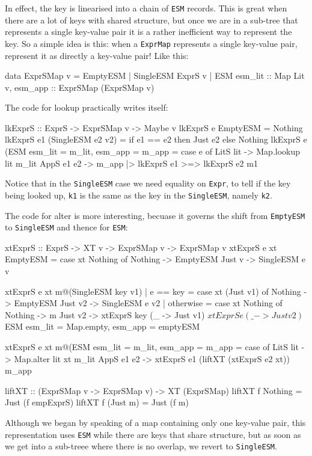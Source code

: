 \documentclass[acmsmall]{acmart}
\theoremstyle{theorem}
\theoremstyle{definition}
\theoremstyle{remark}
\begin{document}
In effect, the key is linearised into a chain of \lstinline{ESM} records.
This is great when there are a lot of keys with shared structure, but
once we are in a sub-tree that represents a single key-value pair it is
a rather inefficient way to represent the key.  So a simple idea is this:
when a \lstinline{ExprMap} represents a single key-value pair, represent it
as directly a key-value pair!  Like this:
\begin{code}
data ExprSMap v = EmptyESM
                | SingleESM ExprS v
                | ESM { esm_lit :: Map Lit v, esm_app :: ExprSMap (ExprSMap v) }
\end{code}
The code for lookup practically writes itself:
\begin{code}
lkExprS :: ExprS -> ExprSMap v -> Maybe v
lkExprS e EmptyESM
  = Nothing
lkExprS e1 (SingleESM e2 v2)
= if e1 == e2 then Just e2
              else Nothing
lkExprS e (ESM { esm_lit = m_lit, esm_app = m_app }
  = case e of
     LitS lit   -> Map.lookup lit m_lit
     AppS e1 e2 -> m_app |> lkExprS e1 >=> lkExprS e2 m1
\end{code}
Notice that in the \lstinline{SingleESM} case we need equality on \lstinline{Expr},
to tell if the key being looked up, \lstinline{k1} is the same as the key in
the \lstinline{SingleESM}, namely \lstinline{k2}.

The code for alter is more interesting, becuase it governs the shift from
\lstinline{EmptyESM} to \lstinline{SingleESM} and thence for \lstinline{ESM}:
\begin{code}
xtExprS  :: ExprS -> XT v -> ExprSMap v -> ExprSMap v
xtExprS e xt EmptyESM
  = case xt Nothing of
      Nothing -> EmptyESM
      Just v  -> SingleESM e v

xtExprS e xt m@(SingleESM key v1)
  | e == key
  = case xt (Just v1) of
      Nothing -> EmptyESM
      Just v2  -> SingleESM e v2
  | otherwise
  = case xt Nothing of
      Nothing -> m
      Just v2 -> xtExprS key (\_ -> Just v1) $
                 xtExprS e   (\_ -> Just v2) $
                 ESM { esm_lit = Map.empty, esm_app = emptyESM }

xtExprS e xt m@(ESM { esm_lit = m_lit, esm_app = m_app }
  = case of
      LitS lit   -> Map.alter lit xt m_lit
      AppS e1 e2 -> xtExprS e1 (liftXT (xtExprS e2 xt)) m_app

liftXT :: (ExprSMap v -> ExprSMap v) -> XT (ExprSMap)
liftXT f Nothing  = Just (f empExprS)
liftXT f (Just m) = Just (f m)
\end{code}
Although we began by speaking of a map containing only one key-value pair,
this representation uses \lstinline{ESM} while there are keys that share structure,
but as soon as we get into a sub-treee where there is no overlap, we revert
to \lstinline{SingleESM}.
\end{document}
